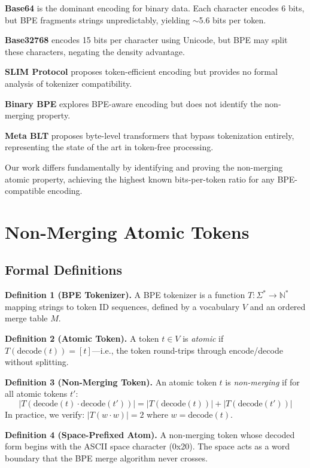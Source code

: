 \documentclass[10pt,twocolumn,letterpaper]{article}
\begin{document}
\textbf{Base64} \cite{base64} is the dominant encoding for binary data. Each character encodes 6 bits, but BPE fragments strings unpredictably, yielding $\sim$5.6 bits per token.

\textbf{Base32768} \cite{base32768} encodes 15 bits per character using Unicode, but BPE may split these characters, negating the density advantage.

\textbf{SLIM Protocol} \cite{slim} proposes token-efficient encoding but provides no formal analysis of tokenizer compatibility.

\textbf{Binary BPE} \cite{binarybpe} explores BPE-aware encoding but does not identify the non-merging property.

\textbf{Meta BLT} \cite{metablt} proposes byte-level transformers that bypass tokenization entirely, representing the state of the art in token-free processing.

Our work differs fundamentally by identifying and proving the non-merging atomic property, achieving the highest known bits-per-token ratio for any BPE-compatible encoding.

\section{Non-Merging Atomic Tokens}

\subsection{Formal Definitions}

\textbf{Definition 1 (BPE Tokenizer).} A BPE tokenizer is a function $T: \Sigma^* \to \mathbb{N}^*$ mapping strings to token ID sequences, defined by a vocabulary $V$ and an ordered merge table $M$.

\textbf{Definition 2 (Atomic Token).} A token $t \in V$ is \textit{atomic} if $T(\text{decode}(t)) = [t]$---i.e., the token round-trips through encode/decode without splitting.

\textbf{Definition 3 (Non-Merging Token).} An atomic token $t$ is \textit{non-merging} if for all atomic tokens $t'$:
\begin{equation}
|T(\text{decode}(t) \cdot \text{decode}(t'))| = |T(\text{decode}(t))| + |T(\text{decode}(t'))|
\end{equation}
In practice, we verify: $|T(w \cdot w)| = 2$ where $w = \text{decode}(t)$.

\textbf{Definition 4 (Space-Prefixed Atom).} A non-merging token whose decoded form begins with the ASCII space character (0x20). The space acts as a word boundary that the BPE merge algorithm never crosses.
\end{document}

